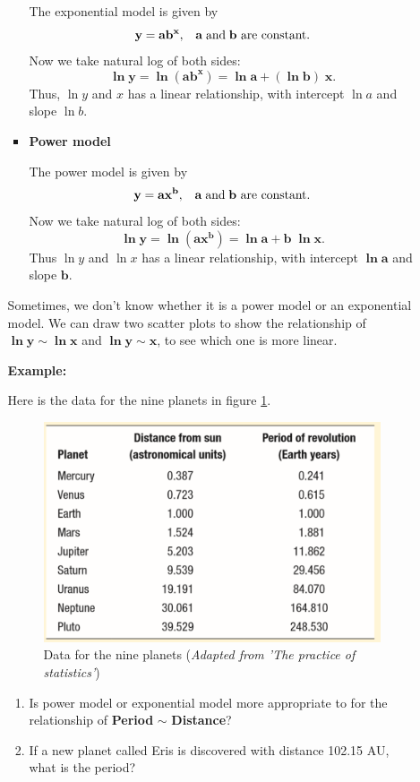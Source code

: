 \documentclass[a4paper, 12pt,twoside]{book}
\begin{document}
\begin{itemize}
\begin{itemize}
\begin{itemize}
 The exponential model is given by $$\mathbf{y=ab^x, \hspace{0.3cm} a\; \text{and}\; b \text{ are constant}.}$$ 
 Now we take natural log of both sides:$$\mathbf{\ln y = \ln(ab^x) = \ln a + (\ln b)\; x}.$$
Thus, $\ln y $ and $x$ has a linear relationship, with intercept $\ln a$ and slope $\ln b$.
\vspace{0.6cm}

\item \textbf{Power model}
\vspace{0.6cm}

The power model is given by
$$\mathbf{y=ax^b, \hspace{0.3cm} a\; \text{and}\; b \text{ are constant}.}$$ 
Now we take natural log of both sides:$$\mathbf{\ln y = \ln(ax^b) = \ln a +  b\;\ln x}.$$
Thus $\ln y $  and $\ln x $ has a linear relationship, with intercept $\mathbf{\ln a}$ and slope $\mathbf{b}$.
\end{itemize}
\vspace{0.6cm}

Sometimes, we don't know whether it is a power model or an exponential model. We can draw two scatter plots to show the relationship of $\mathbf{\ln y \sim \ln x} $ and $\mathbf{\ln y \sim x}$, to see which one
 is more linear.
 \vspace{0.6cm}
 
\textbf{Example:}
 \vspace{0.6cm}

Here is the data for the nine planets in figure \ref{Planets}.

\begin{figure}[H]
\centering
\includegraphics[scale=0.5]{Planets.png}
\caption{Data for the nine planets (\textit{Adapted from 'The practice of statistics'})}
\label{Planets}
\end{figure}
\begin{enumerate}[(1)]
\item Is power model or exponential model more appropriate to for the relationship of \textbf{Period} $\sim$ \textbf{Distance}?
\item If a new planet called Eris is discovered with distance 102.15 AU, what is the period?
\end{enumerate}
\end{itemize}
\end{itemize}
\end{document}
